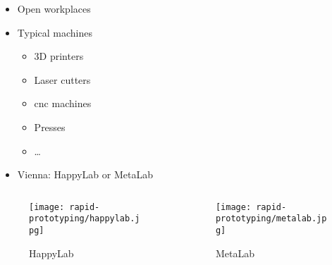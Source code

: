 \begin{frame}
    \begin{itemize}
        \item Open workplaces
        \item Typical machines
              \begin{itemize}
                  \item 3D printers
                  \item Laser cutters
                  \item \acs{cnc} machines
                  \item Presses
                  \item \ldots
              \end{itemize}
        \item Vienna: HappyLab or MetaLab
    \end{itemize}
    \begin{columns}
        \begin{column}{0.55\textwidth}
            \begin{figure}
                \texttt{[image: rapid-prototyping/happylab.jpg]}
                \caption{HappyLab}
            \end{figure}
        \end{column}
        \begin{column}{0.45\textwidth}
            \begin{figure}
                \texttt{[image: rapid-prototyping/metalab.jpg]}
                \caption{MetaLab}
            \end{figure}
        \end{column}
    \end{columns}
\end{frame}